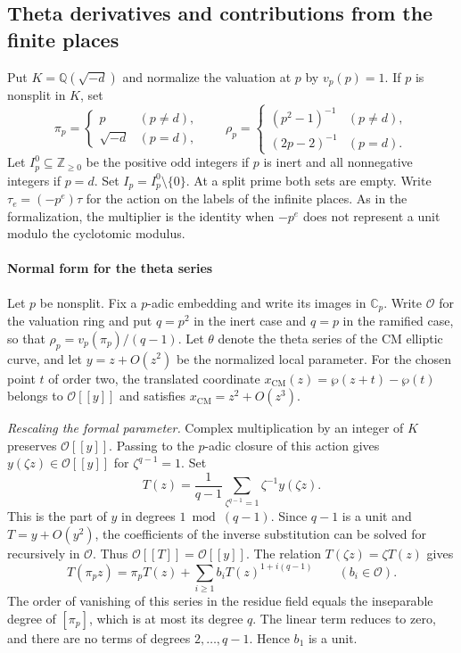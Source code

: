 \subsection{Theta derivatives and contributions from the finite places}

Put \(K=\mathbb Q(\sqrt{-d})\) and normalize the valuation at \(p\)
by \(v_p(p)=1\). If \(p\) is nonsplit in \(K\), set
\[
  \pi_p=\begin{cases}p & (p\ne d),\\ \sqrt{-d}&(p=d),\end{cases}
  \qquad
  \rho_p=\begin{cases}(p^2-1)^{-1}&(p\ne d),\\
                        (2p-2)^{-1}&(p=d).\end{cases}
\]
Let \(I_p^0\subseteq\mathbb Z_{\ge0}\) be the positive odd integers if \(p\)
is inert and all nonnegative integers if \(p=d\).
Set \(I_p=I_p^0\setminus\{0\}\). At a split prime both sets are empty.
Write \(\tau_e=(-p^e)\tau\) for the action on the labels of the infinite places.
As in the formalization, the multiplier is the identity when \(-p^e\)
does not represent a unit modulo the cyclotomic modulus.

\paragraph{Normal form for the theta series}
Let \(p\) be nonsplit. Fix a \(p\)-adic embedding and write its images in
\(\mathbb C_p\). Write \(\mathcal O\) for the valuation ring and put
\(q=p^2\) in the inert case and \(q=p\) in the ramified case, so that
\(\rho_p=v_p(\pi_p)/(q-1)\). Let \(\theta\) denote the theta series of
the CM elliptic curve, and let \(y=z+O(z^2)\) be the normalized local
parameter. For the chosen point \(t\) of order two, the translated
coordinate \(x_\mathrm{CM}(z)=\wp(z+t)-\wp(t)\) belongs to
\(\mathcal O[[y]]\) and satisfies \(x_\mathrm{CM}=z^2+O(z^3)\).

\emph{Rescaling the formal parameter.}
Complex multiplication by an integer of \(K\) preserves
\(\mathcal O[[y]]\). Passing to the \(p\)-adic closure of this action gives
\(y(\zeta z)\in\mathcal O[[y]]\) for \(\zeta^{q-1}=1\). Set
\[
 T(z)=\frac{1}{q-1}\sum_{\zeta^{q-1}=1}\zeta^{-1}y(\zeta z).
\]
This is the part of \(y\) in degrees \(1\bmod(q-1)\).
Since \(q-1\) is a unit and \(T=y+O(y^2)\), the coefficients of the inverse
substitution can be solved for recursively in \(\mathcal O\).
Thus \(\mathcal O[[T]]=\mathcal O[[y]]\).
The relation \(T(\zeta z)=\zeta T(z)\) gives
\[
 T(\pi_p z)=\pi_p T(z)+\sum_{i\ge1}b_i T(z)^{1+i(q-1)}
 \qquad (b_i\in\mathcal O).
\]
The order of vanishing of this series in the residue field equals the
inseparable degree of \([\pi_p]\), which is at most its degree \(q\).
The linear term reduces to zero, and there are no terms of degrees
\(2,\ldots,q-1\). Hence \(b_1\) is a unit.


